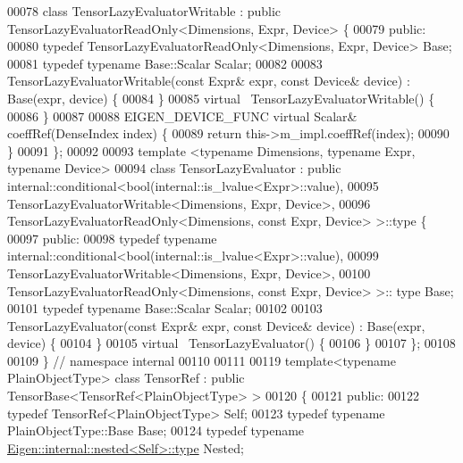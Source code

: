 \begin{DoxyCode}
00078 \textcolor{keyword}{class }TensorLazyEvaluatorWritable : \textcolor{keyword}{public} TensorLazyEvaluatorReadOnly<Dimensions, Expr, Device> \{
00079  \textcolor{keyword}{public}:
00080   \textcolor{keyword}{typedef} TensorLazyEvaluatorReadOnly<Dimensions, Expr, Device> Base;
00081   \textcolor{keyword}{typedef} \textcolor{keyword}{typename} Base::Scalar Scalar;
00082 
00083   TensorLazyEvaluatorWritable(\textcolor{keyword}{const} Expr& expr, \textcolor{keyword}{const} Device& device) : Base(expr, device) \{
00084   \}
00085   \textcolor{keyword}{virtual} ~TensorLazyEvaluatorWritable() \{
00086   \}
00087 
00088   EIGEN\_DEVICE\_FUNC \textcolor{keyword}{virtual} Scalar& coeffRef(DenseIndex index) \{
00089     \textcolor{keywordflow}{return} this->m\_impl.coeffRef(index);
00090   \}
00091 \};
00092 
00093 \textcolor{keyword}{template} <\textcolor{keyword}{typename} Dimensions, \textcolor{keyword}{typename} Expr, \textcolor{keyword}{typename} Device>
00094 \textcolor{keyword}{class }TensorLazyEvaluator : \textcolor{keyword}{public} internal::conditional<bool(internal::is\_lvalue<Expr>::value),
00095                             TensorLazyEvaluatorWritable<Dimensions, Expr, Device>,
00096                             TensorLazyEvaluatorReadOnly<Dimensions, const Expr, Device> >::type \{
00097  \textcolor{keyword}{public}:
00098   \textcolor{keyword}{typedef} \textcolor{keyword}{typename} internal::conditional<bool(internal::is\_lvalue<Expr>::value),
00099                                          TensorLazyEvaluatorWritable<Dimensions, Expr, Device>,
00100                                          TensorLazyEvaluatorReadOnly<Dimensions, const Expr, Device> >::
      type Base;
00101   \textcolor{keyword}{typedef} \textcolor{keyword}{typename} Base::Scalar Scalar;
00102 
00103   TensorLazyEvaluator(\textcolor{keyword}{const} Expr& expr, \textcolor{keyword}{const} Device& device) : Base(expr, device) \{
00104   \}
00105   \textcolor{keyword}{virtual} ~TensorLazyEvaluator() \{
00106   \}
00107 \};
00108 
00109 \}  \textcolor{comment}{// namespace internal}
00110 
00111 
00119 \textcolor{keyword}{template}<\textcolor{keyword}{typename} PlainObjectType> \textcolor{keyword}{class }TensorRef : \textcolor{keyword}{public} TensorBase<TensorRef<PlainObjectType> >
00120 \{
00121   \textcolor{keyword}{public}:
00122     \textcolor{keyword}{typedef} TensorRef<PlainObjectType> Self;
00123     \textcolor{keyword}{typedef} \textcolor{keyword}{typename} PlainObjectType::Base Base;
00124     \textcolor{keyword}{typedef} \textcolor{keyword}{typename} \hyperlink{class_eigen_1_1internal_1_1_tensor_lazy_evaluator_writable}{Eigen::internal::nested<Self>::type} Nested;

\end{DoxyCode}
